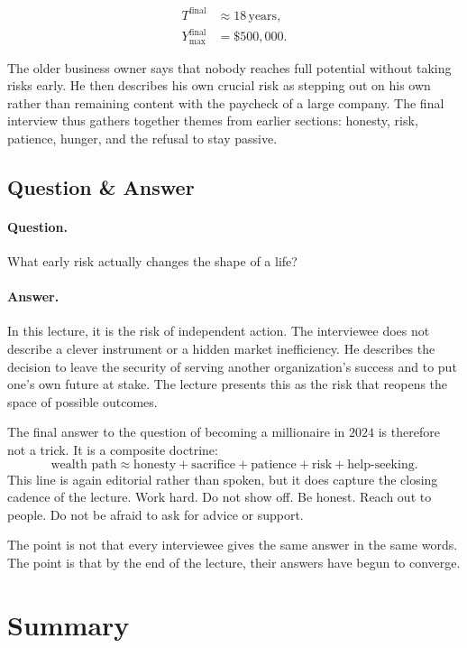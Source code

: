 \begin{align}
T^{\mathrm{final}} &\approx 18\,\text{years},\\
Y_{\max}^{\mathrm{final}} &= \$500{,}000.
\end{align}

The older business owner says that nobody reaches full potential without taking risks early. He then describes his own crucial risk as stepping out on his own rather than remaining content with the paycheck of a large company. The final interview thus gathers together themes from earlier sections: honesty, risk, patience, hunger, and the refusal to stay passive.

\subsection{Question \& Answer}

\paragraph{Question.}
What early risk actually changes the shape of a life?

\paragraph{Answer.}
In this lecture, it is the risk of independent action. The interviewee does not describe a clever instrument or a hidden market inefficiency. He describes the decision to leave the security of serving another organization's success and to put one's own future at stake. The lecture presents this as the risk that reopens the space of possible outcomes.

The final answer to the question of becoming a millionaire in \(2024\) is therefore not a trick. It is a composite doctrine:
\begin{equation}
\text{wealth path} \approx \text{honesty} + \text{sacrifice} + \text{patience} + \text{risk} + \text{help-seeking}.
\end{equation}
This line is again editorial rather than spoken, but it does capture the closing cadence of the lecture. Work hard. Do not show off. Be honest. Reach out to people. Do not be afraid to ask for advice or support.

The point is not that every interviewee gives the same answer in the same words. The point is that by the end of the lecture, their answers have begun to converge.

\section{Summary}

